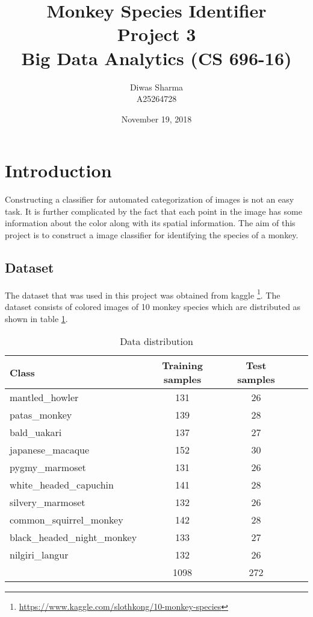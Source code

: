 \documentclass[12pt]{article}
\title{Monkey Species Identifier\\ \normalsize Project 3 \\ \small Big Data Analytics (CS 696-16)}
\author{Diwas Sharma \\ A25264728}
\date{November 19, 2018}
\begin{document}
\maketitle
\thispagestyle{empty}
\newpage

\tableofcontents
\thispagestyle{empty}
\newpage


\section{Introduction}
Constructing a classifier for automated categorization of images is not an easy task. It is further complicated by
the fact that each point in the image has some information about the color along with its spatial information. The aim of this
project is to construct a image classifier for identifying the species of a monkey.

\subsection{Dataset}
The dataset that was used in this project was obtained from kaggle \footnote{\url{https://www.kaggle.com/slothkong/10-monkey-species}}.
The dataset consists of colored images of 10 monkey species which are distributed as shown in table \ref{tbl:dataset}. 

\begin{table}[ht]
\centering
\begin{tabular}{ l c c c r }
\hline
Class                        & Training samples & Test samples \\
\hline
mantled\_howler              & 131              & 26 \\
patas\_monkey                & 139              & 28 \\
bald\_uakari                 & 137              & 27 \\
japanese\_macaque            & 152              & 30 \\
pygmy\_marmoset              & 131              & 26 \\
white\_headed\_capuchin      & 141              & 28 \\
silvery\_marmoset            & 132              & 26 \\
common\_squirrel\_monkey     & 142              & 28 \\
black\_headed\_night\_monkey & 133              & 27 \\
nilgiri\_langur              & 132              & 26 \\
\hline
& 1098 & 272 \\
\end{tabular}
\caption{Data distribution}
\label{tbl:dataset}
\end{table}
\end{document}
